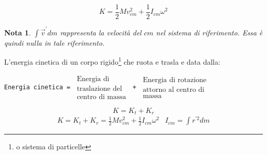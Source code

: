 \documentclass{book}
\newtheorem{nota}{Nota}
\begin{document}
\begin{equation}
  \boxed{K=\frac{1}{2}Mv^2_{cm}+\frac{1}{2}I_{cm}\omega^2}
\end{equation}
\begin{nota}
  $\displaystyle\int \vec{v}^\prime dm$ rappresenta la velocità del $cm$ nel sistema
  di riferimento. Essa è quindi nulla in tale riferimento.
\end{nota}
L'energia cinetica di un corpo rigido\footnote{o sistema di particelle} che ruota e trasla
e data dalla:\\
\begin{center}
  \texttt{Energia cinetica = $\begin{matrix}\text{Energia di} \\ \text{traslazione del}\\
                                \text{centro di massa}\end{matrix}$ + $\begin{matrix}
                                                                         \text{Energia di
    rotazione} \\ \text{attorno al centro di}\\ \text{massa}\end{matrix}$}
\end{center}
\begin{equation}
  \boxed{K=K_t+K_r}
\end{equation}
\begin{eqnarray*}
  \boxed{K=K_t+K_r=\frac{1}{2}Mv^2_{cm}+\frac{1}{2}I_{cm}\omega^2} & I_{cm}=
                                                                    \int r^{\prime2}dm
\end{eqnarray*}
\end{document}

